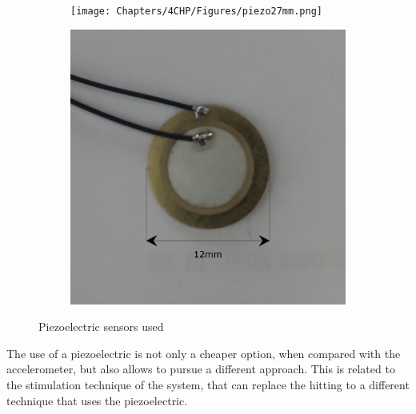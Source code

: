 \begin{figure}[]
    \centering
    \begin{subfigure}{0.45\textwidth}
        \centering
        \texttt{[image: Chapters/4CHP/Figures/piezo27mm.png]}
        \caption{}{}
        \label{subfig:piezo1}
    \end{subfigure}
    \begin{subfigure}{0.45\textwidth}
        \centering
        \includegraphics[width=\linewidth]{Chapters/4CHP/Figures/piezo12mm.png}
        \caption{}{}
        \label{subfig:piezo2}
    \end{subfigure}
    \caption{Piezoelectric sensors used}{}
    \label{fig:UsedPiezos}
\end{figure}
The use of a piezoelectric is not only a cheaper option, when compared with the accelerometer, but also allows to pursue a different approach. This is related to the stimulation technique of the system, that can replace the hitting to a different technique that uses the piezoelectric. 

